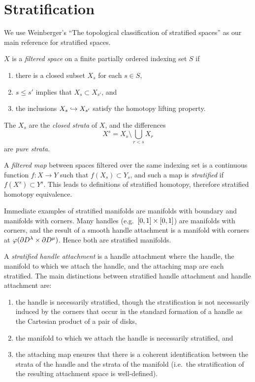 \section{Stratification}
\label{section:problem-stratification}

We use Weinberger's ``The topological classification of stratified spaces'' \cite{wein94} as our main reference for stratified spaces.

\begin{defn}[Stratification]
	$X$ is a \emph{filtered space} on a finite partially ordered indexing set $S$ if 
	\begin{enumerate}
		\item there is a closed subset $X_s$ for each $s\in S$,
		\item $s\leq s'$ implies that $X_s\subset X_{s'}$, and
		\item the inclusions $X_s \hookrightarrow X_{s'}$ satisfy the homotopy lifting property.
	\end{enumerate}
	The $X_s$ are the \emph{closed strata} of $X$, and the differences
	$$X^s = X_s\setminus \bigcup_{r < s} X_r$$
	are \emph{pure strata}.
	
	
	A \emph{filtered map} between spaces filtered over the same indexing set is a continuous function $f:X\to Y$ such that $f(X_s)\subset Y_s$, and such a map is \emph{stratified} if $f(X^s) \subset Y^s$.
	This leads to definitions of stratified homotopy, therefore stratified homotopy equivalence.
\end{defn}

Immediate examples of stratified manifolds are manifolds with boundary and manifolds with corners.
Many handles (e.g.\ $[0,1]\times[0,1]$) are manifolds with corners, and the result of a smooth handle attachment is a manifold with corners at $\varphi(\partial D^\lambda \times \partial D^\mu)$.
Hence both are stratified manifolds.

A \emph{stratified handle attachment} is a handle attachment where the handle, the manifold to which we attach the handle, and the attaching map are each stratified.
The main distinctions between stratified handle attachment and handle attachment are:
\begin{enumerate}
	\item the handle is necessarily stratified, though the stratification is not necessarily induced by the corners that occur in the standard formation of a handle as the Cartesian product of a pair of disks,
	
	\item the manifold to which we attach the handle is necessarily stratified, and
	
	\item the attaching map ensures that there is a coherent identification between the strata of the handle and the strata of the manifold (i.e.\ the stratification of the resulting attachment space is well-defined).
\end{enumerate}
